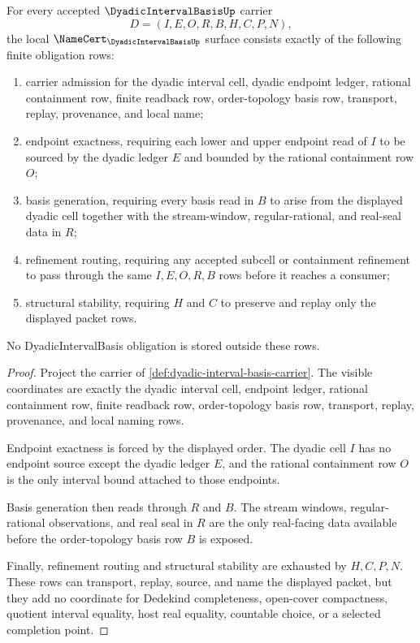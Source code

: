 \begin{theorem}
\label{thm:dyadic-interval-basis-namecert-obligations}
For every accepted $\DyadicIntervalBasisUp$ carrier
$$
D=(I,E,O,R,B,H,C,P,N),
$$
the local $\NameCert_{\DyadicIntervalBasisUp}$ surface consists exactly of the following finite obligation rows:
\begin{enumerate}
\item carrier admission for the dyadic interval cell, dyadic endpoint ledger, rational containment row, finite readback row, order-topology basis row, transport, replay, provenance, and local name;
\item endpoint exactness, requiring each lower and upper endpoint read of $I$ to be sourced by the dyadic ledger $E$ and bounded by the rational containment row $O$;
\item basis generation, requiring every basis read in $B$ to arise from the displayed dyadic cell together with the stream-window, regular-rational, and real-seal data in $R$;
\item refinement routing, requiring any accepted subcell or containment refinement to pass through the same $I,E,O,R,B$ rows before it reaches a consumer;
\item structural stability, requiring $H$ and $C$ to preserve and replay only the displayed packet rows.
\end{enumerate}
No DyadicIntervalBasis obligation is stored outside these rows.
\end{theorem}
\begin{proof}
Project the carrier of \autoref{def:dyadic-interval-basis-carrier}. The visible coordinates are exactly the dyadic interval cell, endpoint ledger, rational containment row, finite readback row, order-topology basis row, transport, replay, provenance, and local naming rows.

Endpoint exactness is forced by the displayed order. The dyadic cell $I$ has no endpoint source except the dyadic ledger $E$, and the rational containment row $O$ is the only interval bound attached to those endpoints.

Basis generation then reads through $R$ and $B$. The stream windows, regular-rational observations, and real seal in $R$ are the only real-facing data available before the order-topology basis row $B$ is exposed.

Finally, refinement routing and structural stability are exhausted by $H,C,P,N$. These rows can transport, replay, source, and name the displayed packet, but they add no coordinate for Dedekind completeness, open-cover compactness, quotient interval equality, host real equality, countable choice, or a selected completion point.
\end{proof}

